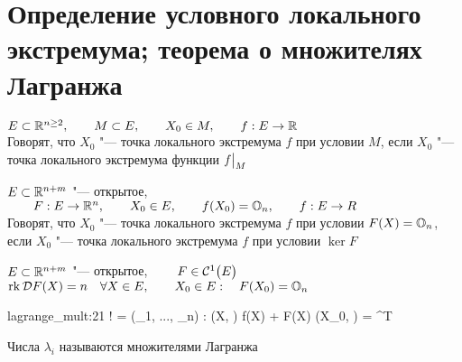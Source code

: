 \section{Определение условного локального экстремума; теорема о множителях Лагранжа}

\begin{definition}
	$ E \sub \R^{n \ge 2}, \qquad M \sub E, \qquad X_0 \in M, \qquad f : E \to \R $ \\
	Говорят, что $ X_0 $ "--- точка локального экстремума $ f $ при условии $ M $, если $ X_0 $ "--- точка локального экстремума функции $ f\clamp{M} $
\end{definition}

\begin{definition}
	$ E \sub \R^{n + m} $ "--- открытое, $ \qquad F : E \to \R^n, \qquad X_0 \in E, \qquad f(X_0) = \On, \qquad f : E \to R $ \\
	Говорят, что $ X_0 $ "--- точка локального экстремума $ f $ при условии $ F(X) = \On $, если $ X_0 $ "--- точка локального экстремума $ f $ при условии $ \ker F $
\end{definition}

\begin{theorem}
	$ E \sub \R^{n + m} $ "--- открытое, $ \qquad F \in \Cont[1]E $ \\
	$ \rk \mc{D}F(X) = n \quad \forall X \in E, \qquad X_0 \in E : \quad F(X_0) = \On $
	\begin{equ}{lagrange_mult:21}
		\implies \exist! \Lambda = (\lambda_1, ..., \lambda_n) : \quad {} \vphi(X, \Lambda)  f(X) + \Lambda F(X) \qquad \nabla \vphi(X_0, \Lambda) = \On[n + m]^T
	\end{equ}
\end{theorem}

\begin{remark}
	Числа $ \lambda_i $ называются множителями Лагранжа
\end{remark}


